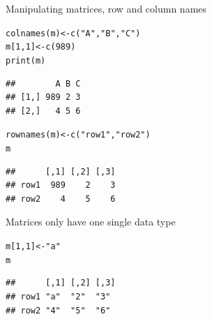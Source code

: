 \documentclass[xcolor=table,       handout,    xcolor=dvipsnames]{beamer}\usepackage[]{graphicx}\usepackage[]{color}
\makeatletter
\newcommand{\hlnum}[1]{\textcolor[rgb]{0,0,0}{#1}}
\newcommand{\hlstr}[1]{\textcolor[rgb]{0.545,0.137,0.137}{#1}}
\newcommand{\hlstd}[1]{\textcolor[rgb]{0,0,0}{#1}}
\newcommand{\hlkwb}[1]{\textcolor[rgb]{0,0,0}{#1}}
\newcommand{\hlkwd}[1]{\textcolor[rgb]{0,0,1}{#1}}
\newenvironment{kframe}{%
 \def\at@end@of@kframe{}%
 \ifinner\ifhmode%
  \def\at@end@of@kframe{\end{minipage}}%
  \begin{minipage}{\columnwidth}%
 \fi\fi%
 \def\FrameCommand##1{\hskip\@totalleftmargin \hskip-\fboxsep
 \colorbox{shadecolor}{##1}\hskip-\fboxsep
     \hskip-\linewidth \hskip-\@totalleftmargin \hskip\columnwidth}%
 \MakeFramed {\advance\hsize-\width
   \@totalleftmargin\z@ \linewidth\hsize
   \@setminipage}}%
 {\par\unskip\endMakeFramed%
 \at@end@of@kframe}
\newenvironment{knitrout}{}{} %
\makeatother
\begin{document}
\begin{frame}[fragile]{Manipulating matrices, row and column names}
\begin{knitrout}
\color{fgcolor}\begin{kframe}
\begin{alltt}
\hlkwd{colnames}\hlstd{(m)} \hlkwb{<-} \hlkwd{c}\hlstd{(}\hlstr{"A"}\hlstd{,} \hlstr{"B"}\hlstd{,} \hlstr{"C"}\hlstd{)}
\hlstd{m[}\hlnum{1}\hlstd{,}\hlnum{1}\hlstd{]} \hlkwb{<-} \hlkwd{c}\hlstd{(}\hlnum{989}\hlstd{)}
\hlkwd{print}\hlstd{(m)}
\end{alltt}
\begin{verbatim}
##        A B C
## [1,] 989 2 3
## [2,]   4 5 6
\end{verbatim}
\end{kframe}
\end{knitrout}
\begin{knitrout}
\color{fgcolor}\begin{kframe}
\begin{alltt}
\hlkwd{rownames}\hlstd{(m)} \hlkwb{<-} \hlkwd{c}\hlstd{(}\hlstr{"row1"}\hlstd{,} \hlstr{"row2"}\hlstd{)}
\hlstd{m}
\end{alltt}
\begin{verbatim}
##      [,1] [,2] [,3]
## row1  989    2    3
## row2    4    5    6
\end{verbatim}
\end{kframe}
\end{knitrout}
\end{frame}


\begin{frame}[fragile]{Matrices only have one single data type}
\begin{knitrout}
\color{fgcolor}\begin{kframe}
\begin{alltt}
\hlstd{m[}\hlnum{1}\hlstd{,}\hlnum{1}\hlstd{]} \hlkwb{<-} \hlstr{"a"}
\hlstd{m}
\end{alltt}
\begin{verbatim}
##      [,1] [,2] [,3]
## row1 "a"  "2"  "3" 
## row2 "4"  "5"  "6"
\end{verbatim}
\end{kframe}
\end{knitrout}
\end{frame}
\end{document}
